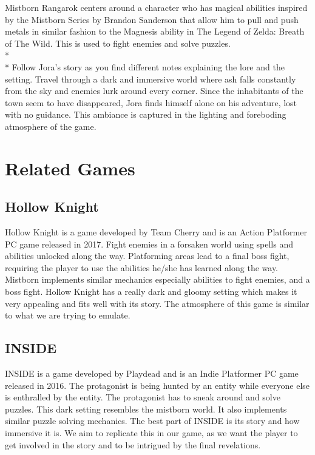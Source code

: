 \documentclass{article}
\begin{document}
Mistborn Rangarok centers around a character who has magical abilities inspired by the Mistborn Series by Brandon Sanderson that allow him to pull and push metals in similar fashion to the Magnesis ability in The Legend of Zelda: Breath of The Wild. This is used to fight enemies and solve puzzles.
\\*\\*
Follow Jora's story as you find different notes explaining the lore and the setting. Travel through a dark and immersive world where ash falls constantly from the sky and enemies lurk around every corner. Since the inhabitants of the town seem to have disappeared, Jora finds himself alone on his adventure, lost with no guidance. This ambiance is captured in the lighting and foreboding atmosphere of the game.

\section{Related Games}

\subsection{Hollow Knight}
Hollow Knight is a game developed by Team Cherry and is an Action Platformer PC game released in 2017.
Fight enemies in a forsaken world using spells and abilities unlocked along the way. Platforming areas lead to a final boss fight, requiring the player to use the abilities he/she has learned along the way. Mistborn implements similar mechanics especially abilities to fight enemies, and a boss fight. Hollow Knight has a really dark and gloomy setting which makes it very appealing and fits well with its story. The atmosphere of this game is similar to what we are trying to emulate.

\subsection{INSIDE}
INSIDE is a game developed by Playdead and is an Indie Platformer PC game released in 2016.
The protagonist is being hunted by an entity while everyone else is enthralled by the entity. The protagonist has to sneak around and solve puzzles. This dark setting resembles the mistborn world. It also implements similar puzzle solving mechanics. The best part of INSIDE is its story and how immersive it is. We aim to replicate this in our game, as we want the player to get involved in the story and to be intrigued by the final revelations.
\end{document}
